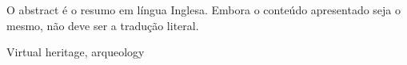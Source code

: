 O abstract é o resumo em língua Inglesa. 
Embora o conteúdo apresentado seja o mesmo, não deve ser a tradução literal.

\begin{keywords}
Virtual heritage, arqueology
\end{keywords}